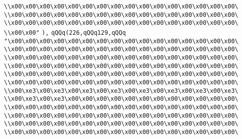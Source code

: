 \verb|\\x00\x00\x00\x00\x00\x00\x00\x00\x00\x00\x00\x00\x00\x00\x00\x00\|\newline
\verb|\\x00\x00\x00\x00\x00\x00\x00\x00\x00\x00\x00\x00\x00\x00\x00\x00\|\newline
\verb|\\x00\x00\x00\x00\x00\x00\x00\x00\x00\x00\x00\x00\x00\x00\x00\x00\|\newline
\verb|\\x00\x00"|\newline
\verb|),|\newline
\verb|qQQq(226,qQQq129,qQQq|\newline
\verb|"\x00\x00\x00\x00\x00\x00\x00\x00\x00\x00\x00\x00\x00\x00\x00\x00\|\newline
\verb|\\x00\x00\x00\x00\x00\x00\x00\x00\x00\x00\x00\x00\x00\x00\x00\x00\|\newline
\verb|\\x00\x00\x00\x00\x00\x00\x00\x00\x00\x00\x00\x00\x00\x00\x00\x00\|\newline
\verb|\\x00\x00\x00\x00\x00\x00\x00\x00\x00\x00\x00\x00\x00\x00\x00\x00\|\newline
\verb|\\x00\x00\x00\x00\x00\x00\x00\x00\x00\x00\x00\x00\x00\x00\x00\x00\|\newline
\verb|\\x00\x00\x00\x00\x00\x00\x00\x00\x00\x00\x00\x00\x00\x00\x00\x00\|\newline
\verb|\\x00\xe3\x00\xe3\x00\xe3\x00\xe3\x00\xe3\x00\xe3\x00\xe3\x00\xe3\|\newline
\verb|\\x00\xe3\x00\xe3\x00\x00\x00\x00\x00\x00\x00\x00\x00\x00\x00\x00\|\newline
\verb|\\x00\x00\x00\x00\x00\x00\x00\x00\x00\x00\x00\x00\x00\x00\x00\x00\|\newline
\verb|\\x00\x00\x00\x00\x00\x00\x00\x00\x00\x00\x00\x00\x00\x00\x00\x00\|\newline
\verb|\\x00\x00\x00\x00\x00\x00\x00\x00\x00\x00\x00\x00\x00\x00\x00\x00\|\newline
\verb|\\x00\x00\x00\x00\x00\x00\x00\x00\x00\x00\x00\x00\x00\x00\x00\x00\|\newline
